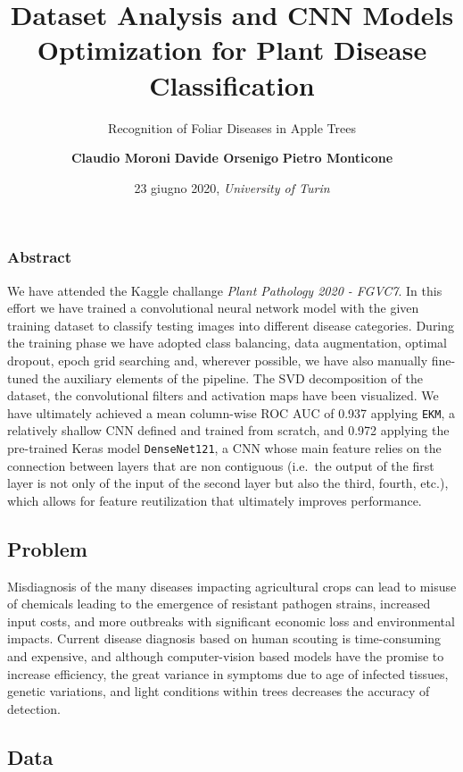 \documentclass[10pt,]{article}
\title{Dataset Analysis and CNN Models Optimization for Plant Disease
Classification}
\subtitle{Recognition of Foliar Diseases in Apple Trees}
\author{\textbf{Claudio Moroni} \textbar{} \textbf{Davide Orsenigo} \textbar{}
\textbf{Pietro Monticone}}
\date{23 giugno 2020, \emph{University of Turin}}
\begin{document}
\maketitle

\hypertarget{abstract}{%
\subsubsection{\texorpdfstring{\textbf{Abstract}}{Abstract}}\label{abstract}}

We have attended the Kaggle challange \emph{Plant Pathology 2020 -
FGVC7}. In this effort we have trained a convolutional neural network
model with the given training dataset to classify testing images into
different disease categories. During the training phase we have adopted
class balancing, data augmentation, optimal dropout, epoch grid
searching and, wherever possible, we have also manually fine-tuned the
auxiliary elements of the pipeline. The SVD decomposition of the
dataset, the convolutional filters and activation maps have been
visualized. We have ultimately achieved a mean column-wise ROC AUC of
0.937 applying \texttt{EKM}, a relatively shallow CNN defined and
trained from scratch, and 0.972 applying the pre-trained Keras model
\texttt{DenseNet121}, a CNN whose main feature relies on the connection
between layers that are non contiguous (i.e.~the output of the first
layer is not only of the input of the second layer but also the third,
fourth, etc.), which allows for feature reutilization that ultimately
improves performance.

\hypertarget{problem}{%
\subsection{\texorpdfstring{\textbf{Problem}}{Problem}}\label{problem}}

Misdiagnosis of the many diseases impacting agricultural crops can lead
to misuse of chemicals leading to the emergence of resistant pathogen
strains, increased input costs, and more outbreaks with significant
economic loss and environmental impacts. Current disease diagnosis based
on human scouting is time-consuming and expensive, and although
computer-vision based models have the promise to increase efficiency,
the great variance in symptoms due to age of infected tissues, genetic
variations, and light conditions within trees decreases the accuracy of
detection.

\hypertarget{data}{%
\subsection{\texorpdfstring{\textbf{Data}}{Data}}\label{data}}
\end{document}

